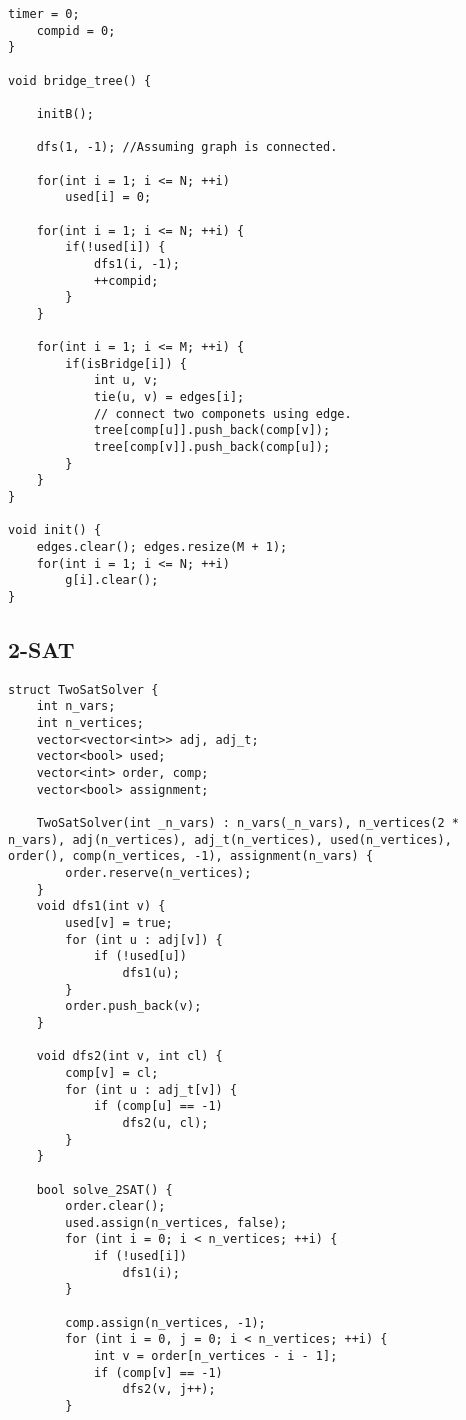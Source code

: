 \documentclass[10pt]{article}
\begin{document}
\begin{multicols*}{2}
\begin{lstlisting}[style=compactcpp]
    timer = 0;
    compid = 0;
}

void bridge_tree() {

    initB();
    
    dfs(1, -1); //Assuming graph is connected.
    
    for(int i = 1; i <= N; ++i)
        used[i] = 0;

    for(int i = 1; i <= N; ++i) {
        if(!used[i]) {
            dfs1(i, -1);
            ++compid;
        }
    }

    for(int i = 1; i <= M; ++i) {
        if(isBridge[i]) {
            int u, v;
            tie(u, v) = edges[i];
            // connect two componets using edge.
            tree[comp[u]].push_back(comp[v]);
            tree[comp[v]].push_back(comp[u]);
        }
    }
}

void init() {
    edges.clear(); edges.resize(M + 1);
    for(int i = 1; i <= N; ++i)
        g[i].clear();
}
\end{lstlisting}


\subsection{2-SAT}

\begin{lstlisting}[style=compactcpp]
struct TwoSatSolver {
    int n_vars;
    int n_vertices;
    vector<vector<int>> adj, adj_t;
    vector<bool> used;
    vector<int> order, comp;
    vector<bool> assignment;

    TwoSatSolver(int _n_vars) : n_vars(_n_vars), n_vertices(2 * n_vars), adj(n_vertices), adj_t(n_vertices), used(n_vertices), order(), comp(n_vertices, -1), assignment(n_vars) {
        order.reserve(n_vertices);
    }
    void dfs1(int v) {
        used[v] = true;
        for (int u : adj[v]) {
            if (!used[u])
                dfs1(u);
        }
        order.push_back(v);
    }

    void dfs2(int v, int cl) {
        comp[v] = cl;
        for (int u : adj_t[v]) {
            if (comp[u] == -1)
                dfs2(u, cl);
        }
    }

    bool solve_2SAT() {
        order.clear();
        used.assign(n_vertices, false);
        for (int i = 0; i < n_vertices; ++i) {
            if (!used[i])
                dfs1(i);
        }

        comp.assign(n_vertices, -1);
        for (int i = 0, j = 0; i < n_vertices; ++i) {
            int v = order[n_vertices - i - 1];
            if (comp[v] == -1)
                dfs2(v, j++);
        }


\end{lstlisting}
\end{multicols*}
\end{document}

